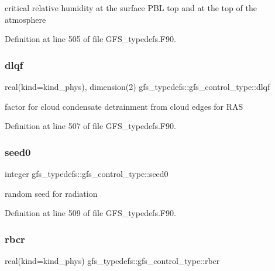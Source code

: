 critical relative humidity at the surface P\+BL top and at the top of the atmosphere 



Definition at line 505 of file G\+F\+S\+\_\+typedefs.\+F90.

\mbox{\label{structgfs__typedefs_1_1gfs__control__type_a410aaf870b8c477791ed7988249b3405}} 
\subsubsection{dlqf}
{\footnotesize\ttfamily real(kind=kind\+\_\+phys), dimension(2) gfs\+\_\+typedefs\+::gfs\+\_\+control\+\_\+type\+::dlqf}



factor for cloud condensate detrainment from cloud edges for R\+AS 



Definition at line 507 of file G\+F\+S\+\_\+typedefs.\+F90.

\mbox{\label{structgfs__typedefs_1_1gfs__control__type_a214d3720944f421c03071d5fd75ab28d}} 
\subsubsection{seed0}
{\footnotesize\ttfamily integer gfs\+\_\+typedefs\+::gfs\+\_\+control\+\_\+type\+::seed0}



random seed for radiation 



Definition at line 509 of file G\+F\+S\+\_\+typedefs.\+F90.

\mbox{\label{structgfs__typedefs_1_1gfs__control__type_a5722cc80d3f4d0391f9383eeffa54b4d}} 
\subsubsection{rbcr}
{\footnotesize\ttfamily real(kind=kind\+\_\+phys) gfs\+\_\+typedefs\+::gfs\+\_\+control\+\_\+type\+::rbcr}




